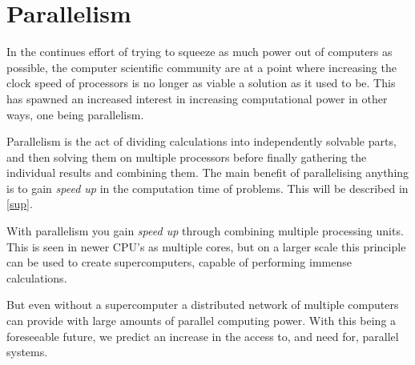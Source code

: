 

\section{Parallelism}

In the continues effort of trying to squeeze as much power out of computers as possible, the computer scientific community are at a point where increasing the clock speed of processors is no longer as viable a solution as it used to be. This has spawned an increased interest in increasing computational power in other ways, one being parallelism.

Parallelism is the act of dividing calculations into independently solvable parts, and then solving them on multiple processors before finally gathering the individual results and combining them. The main benefit of parallelising anything is to gain \emph{speed up} in the computation time of problems. This will be described in \cref{sup}.

With parallelism you gain \emph{speed up} through combining multiple processing units. This is seen in newer CPU's as multiple cores, but on a larger scale this principle can be used to create supercomputers, capable of performing immense calculations.

But even without a supercomputer a distributed network of multiple computers can provide with large amounts of parallel computing power. With this being a foreseeable future, we predict an increase in the access to, and need for, parallel systems.